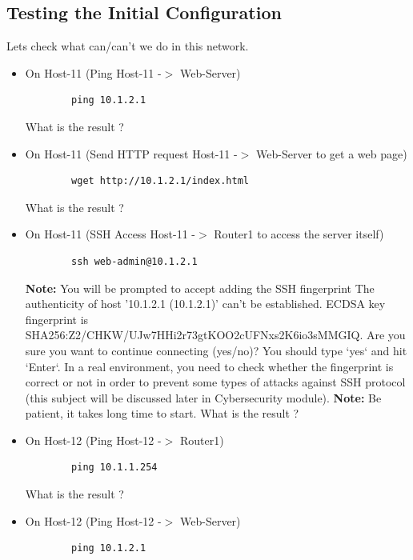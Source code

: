 \subsection{Testing the Initial Configuration}\label{Testing the Initial Configuration}
Lets check what can/can't we do in this network.
\newline
\begin{itemize}
	\item On Host-11 (Ping Host-11 -$>$ Web-Server)
	\begin{verbatim}
	    ping 10.1.2.1
	\end{verbatim}

	What is the result ?
	\item On Host-11 (Send HTTP request Host-11 -$>$ Web-Server to get a web page)
	\begin{verbatim}
	    wget http://10.1.2.1/index.html
	\end{verbatim}

	What is the result ?
	\item On Host-11 (SSH Access Host-11 -$>$ Router1 to access the server itself)
	\begin{verbatim}
	    ssh web-admin@10.1.2.1
	\end{verbatim}

	\textbf{Note:} You will be prompted to accept adding the SSH fingerprint
	\newline
	The authenticity of host '10.1.2.1 (10.1.2.1)' can't be established.
	ECDSA key fingerprint is SHA256:Z2/CHKW/UJw7HHi2r73gtKOO2cUFNxs2K6io3sMMGIQ.
	Are you sure you want to continue connecting (yes/no)?
	You should type `yes` and hit `Enter`. In a real environment, you need to check whether the fingerprint is correct or not in order to prevent some types of attacks against SSH protocol (this subject will be discussed later in Cybersecurity module).
	\newline
	\newline
	\textbf{Note:} Be patient, it takes long time to start.
	\newline
	\newline
	What is the result ?
	\item On Host-12 (Ping Host-12 -$>$ Router1)
	\begin{verbatim}
	    ping 10.1.1.254
	\end{verbatim}

	What is the result ?

	\item On Host-12 (Ping Host-12 -$>$ Web-Server)
	\begin{verbatim}
	    ping 10.1.2.1
	\end{verbatim}


\end{itemize}
